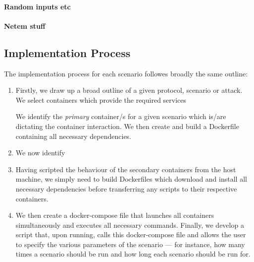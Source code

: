 \documentclass[sigconf,anonymous]{acmart}\usepackage[]{graphicx}\usepackage[]{color}
\begin{document}
\paragraph{Random inputs etc}

\paragraph{Netem stuff}


\subsection{Implementation Process}

The implementation process for each scenario followes broadly the same outline: 

\begin{enumerate}

\item Firstly, we draw up a broad outline of a given protocol, scenario or attack. We select containers which provide the required services 

We identify the \textit{primary} container/s for a given scenario which is/are dictating the container interaction. We then create and build a Dockerfile containing all necessary dependencies. 
  

\item We now identify 
 
\item Having scripted the behaviour of the secondary containers from the host machine, we simply need to build Dockerfiles which download and install all necessary dependencies before transferring any scripts to their respective containers.

\item We then create a docker-compose file that launches all containers simultaneously and executes all necessary commands. Finally, we develop a script that, upon running, calls this docker-compose file and allows the user to specify the various parameters of the scenario --- for instance, how many times a scenario should be run and how long each scenario should be run for.

\end{enumerate}
\end{document}
